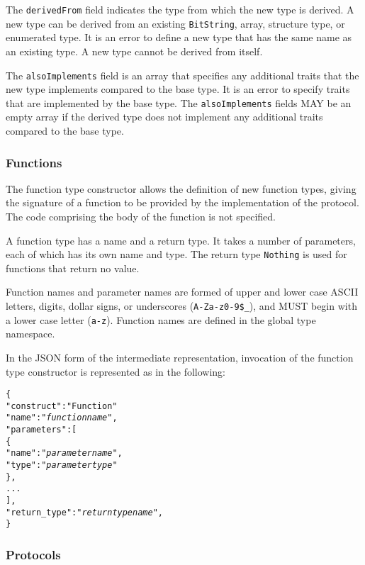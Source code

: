 \documentclass[10pt,twocolumn,a4paper]{article}
\newcommand{\code}[1]{\texttt{#1}}
\begin{document}
The \code{derivedFrom} field indicates the type from which the new type is
derived.  A new type can be derived from an existing \code{BitString},
array, structure type, or enumerated type. It is an error to define a new
type that has the same name as an existing type. A new type cannot be
derived from itself.

The \code{alsoImplements} field is an array that specifies any additional
traits that the new type implements compared to the base type. It is an
error to specify traits that are implemented by the base type.
The \code{alsoImplements} fields MAY be an empty array if the derived type
does not implement any additional traits compared to the base type.

\subsubsection{Functions}
\label{sec:functions}

The function type constructor allows the definition of new function types,
giving the signature of a function to be provided by the implementation of
the protocol. The code comprising the body of the function is not specified. 

A function type has a name and a return type. It takes a number of
parameters, each of which has its own name and type. The return type
\code{Nothing} is used for functions that return no value.

Function names and parameter names are formed of upper and lower case ASCII
letters, digits, dollar signs, or underscores (\code{A-Za-z0-9\$\_}), and
MUST begin with a lower case letter (\code{a-z}).
Function names are defined in the global type namespace.

In the JSON form of the intermediate representation, invocation of the
function type constructor is represented as in the following:
\footnotesize
\begin{alltt}
  \{
    "construct"    : "Function"
    "name"         : "\emph{function name}",
    "parameters"   : [
      \{
        "name" : "\emph{parameter name}",
        "type" : "\emph{parameter type}"
      \},
      ...
    ],
    "return\_type"  : "\emph{return type name}",
  \}
\end{alltt}
\normalsize

\subsubsection{Protocols}
\end{document}
